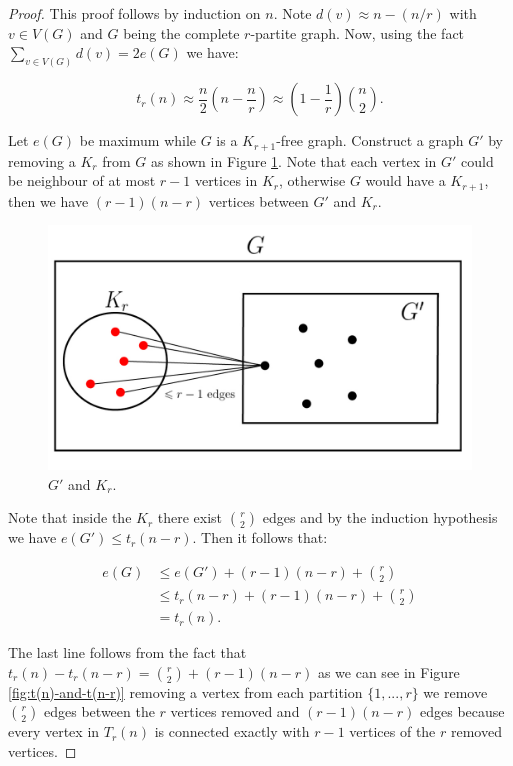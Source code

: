 \documentclass[12pt,twoside,a4paper,bibliography=totocnumbered]{book}
\numberwithin{equation}{section}
\theoremstyle{remark}
\begin{document}
\begin{proof}
This proof follows by induction on $n$. Note $d(v) \approx n-(n/r)$ with $v \in V(G)$ and $G$ being the complete $r$-partite graph. Now, using the fact $\sum_{v\in V(G)} d(v) = 2 e(G)$ we have:

$$ t_r(n) \approx \frac{n}{2}\left(n-\frac{n}{r}\right) \approx \left(1-\frac{1}{r}\right) \binom{n}{2}.$$


 Let $e(G)$ be maximum while $G$ is a $K_{r+1}$-free graph. Construct a graph $G'$ by removing a $K_r$ from $G$ as shown in Figure \ref{fig:G'andKr}. Note that each vertex in $G'$ could be neighbour of at most $r-1$ vertices in $K_r$, otherwise $G$ would have a $K_{r+1}$, then we have $(r-1)(n-r)$ vertices between $G'$ and $K_r$.
 
 \begin{figure}[H]
     \centering
     \includegraphics[scale=1]{Figuras/Kr+1-livre-prova-turan.jpg}
     \caption{$G'$ and $K_r$.}
     \label{fig:G'andKr}
\end{figure}

Note that inside the $K_r$ there exist $\binom{r}{2}$ edges and by the induction hypothesis we have $e(G') \leq t_r(n-r)$. Then it follows that:

\begin{align*}
e(G) &\leq e(G') + (r-1)(n-r) + \binom{r}{2}\\
&\leq t_r(n-r) +(r-1)(n-r) + \binom{r}{2}\\
&= t_r(n).
\end{align*}

The last line follows from the fact that $t_r(n) - t_r(n-r) = \binom{r}{2} + (r-1)(n-r)$ as we can see in Figure \ref{fig:t(n)-and-t(n-r)} removing a vertex from each partition $\{1,...,r\}$ we remove $\binom{r}{2}$ edges between the $r$ vertices removed and $(r-1)(n-r)$ edges  because every vertex in $T_r(n)$ is connected exactly with $r-1$ vertices of the $r$ removed vertices.   


\end{proof}
\end{document}
